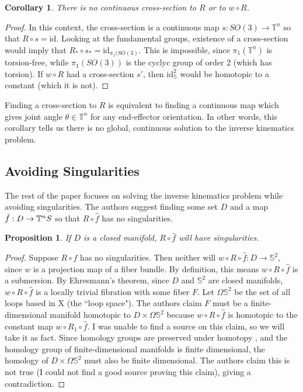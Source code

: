\documentclass[12pt]{article}
\newtheorem{prop}{Proposition}
\newtheorem*{cor}{Corollary}
\theoremstyle{definition}
\begin{document}
\begin{cor}
    There is no continuous cross-section to \(R\) or to \(w \circ R\).
\end{cor}
\begin{proof}
    In this context, the cross-section is a continuous map 
    \(s : SO(3) \rightarrow \mathbb{T}^n\) so that \(R \circ s = \text{id}\). 
    Looking at the fundamental groups, existence of a cross-section would imply
    that \(R_* \circ s_* = \text{id}_{\pi_1(SO(3)}\). This is impossible, since
    \(\pi_1(\mathbb{T}^n)\) is torsion-free, while
    \(\pi_1(SO(3))\) is the cyclyc group of order 2 (which has torsion). 
    If \(w \circ R\) had a cross-section \(s'\), then \(\text{id}_\mathbb{S}^2\)
    would be homotopic to a constant (which it is not).
\end{proof}

Finding a cross-section to \(R\) is equivalent to finding a continuous map which
gives joint angle \(\theta \in \mathbb{T}^n\) for any end-effector orientation.
In other words, this corollary tells us there is no global, continuous solution
to the inverse kinematics problem.

\subsection{Avoiding Singularities}
The rest of the paper focuses on solving the inverse kinematics problem while
avoiding singularities. 
The authors suggest finding some set \(D\) and a map \(\hat{f} : D \rightarrow
\mathbb{T}^n \\ S\) so that \(R \circ \hat{f}\) has no singularities.

\begin{prop}
    If \(D\) is a closed manifold, \(R \circ \hat{f}\) will have singularities.
\end{prop}
\begin{proof}
    Suppose \(R \circ \hat{f}\) has no singularities. Then neither will 
    \(w \circ R \circ \hat{f} : D \rightarrow \mathbb{S}^2\), since \(w\) is a
    projection map of a fiber bundle. By definition, 
    this means \(w \circ R \circ \hat{f}\) is a submersion.
    By Ehresmann's theorem, since \(D\) and \(\mathbb{S}^2\) are closed
    manifolds, \(w \circ R \circ \hat{f}\) is a locally trivial fibration with
    some fiber \(F\).
    Let \(\Omega\mathbb{S}^2\) be the set of all loops based in X (the ``loop
    space").
    The authors claim \(F\) must be a finite-dimensional manifold homotopic to
    \(D \times \Omega\mathbb{S}^2\) because \(w \circ R \circ \hat{f}\) is
    homotopic to the constant map \(w \circ R_1 \circ \hat{f}\). I was unable to
    find a source on this claim, so we will take it as fact.
    Since homology groups are preserved under homotopy \cite{intro-top-manifolds}, and
    the homology group of finite-dimensional manifolds is finite dimensional, the
    homology of \(D \times \Omega\mathbb{S}^2\) must also be finite
    dimensional. The authors claim this is not true (I could not find
    a good source proving this claim), giving a contradiction.
\end{proof}
\end{document}
